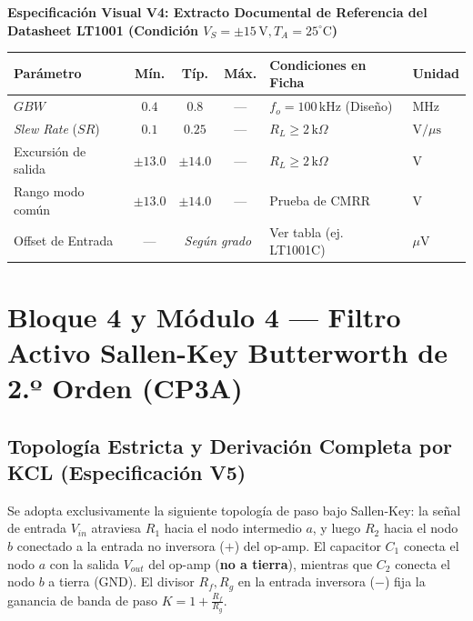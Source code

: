 \documentclass[11pt, a4paper]{article}
\begin{document}
\begin{center}
    \textbf{Especificación Visual V4: Extracto Documental de Referencia del Datasheet LT1001 (Condición $V_S = \pm 15\,\text{V}, T_A = 25^\circ\text{C}$)}
    \par\vspace{0.15cm}
    \begin{tabularx}{\textwidth}{@{} l c c c X l @{}}
    \toprule
    \textbf{Parámetro} & \textbf{Mín.} & \textbf{Típ.} & \textbf{Máx.} & \textbf{Condiciones en Ficha} & \textbf{Unidad} \\ \midrule
    $GBW$ & $0.4$ & $0.8$ & --- & $f_o = 100\,\text{kHz}$ (Diseño) & $\text{MHz}$ \\
    \textit{Slew Rate} ($SR$) & $0.1$ & $0.25$ & --- & $R_L \ge 2\,\text{k}\Omega$ & $\text{V/}\mu\text{s}$ \\
    Excursión de salida & $\pm 13.0$ & $\pm 14.0$ & --- & $R_L \ge 2\,\text{k}\Omega$ & $\text{V}$ \\
    Rango modo común & $\pm 13.0$ & $\pm 14.0$ & --- & Prueba de CMRR & $\text{V}$ \\
    Offset de Entrada & --- & \multicolumn{2}{c}{\textit{Según grado}} & Ver tabla (ej. LT1001C) & $\mu\text{V}$ \\ \bottomrule
    \end{tabularx}
\end{center}

\section{Bloque 4 y Módulo 4 — Filtro Activo Sallen-Key Butterworth de 2.º Orden (CP3A)}

\subsection{Topología Estricta y Derivación Completa por KCL (Especificación V5)}
Se adopta exclusivamente la siguiente topología de paso bajo Sallen-Key: la señal de entrada $V_{in}$ atraviesa $R_1$ hacia el nodo intermedio $a$, y luego $R_2$ hacia el nodo $b$ conectado a la entrada no inversora ($+$) del op-amp. El capacitor $C_1$ conecta el nodo $a$ con la salida $V_{out}$ del op-amp (\textbf{no a tierra}), mientras que $C_2$ conecta el nodo $b$ a tierra ($\text{GND}$). El divisor $R_f, R_g$ en la entrada inversora ($-$) fija la ganancia de banda de paso $K = 1 + \frac{R_f}{R_g}$.
\end{document}
